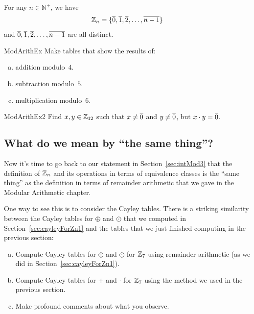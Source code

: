 \begin{prop}{}
For any $n \in \mathbb{N}^+$, we have 
	$$\mathbb{Z}_n = \{ \overline{0}, \overline{1}, \overline{2}, \ldots, \overline{n-1} \}$$
and $\overline{0}, \overline{1}, \overline{2}, \ldots, \overline{n-1}$ are all distinct.
\end{prop}


\begin{exercise}{ModArithEx}  
Make tables that show the results of:
\begin{enumerate}[(a)]
\item \label{ModArithEx-tables-addition} 
addition modulo~$4$.
\item \label{ModArithEx-tables-subtraction} 
subtraction modulo~$5$.
\item \label{ModArithEx-tables-multiplication} 
multiplication modulo~$6$.
\end{enumerate}
\end{exercise}

\begin{exercise}{ModArithEx2}  
Find $x,y \in \mathbb{Z}_{12}$ such that $x \neq \overline{0}$ and $y \neq \overline{0}$, but $x \cdot y = \overline{0}$.
\end{exercise}

\subsection{What do we mean by ``the same thing''?}\label{sec:theSameThing}
Now it's time to go back to our statement in Section~\ref{sec:intMod3} that the definition of $\mathbb{Z}_n$ and its operations in terms of equivalence classes is the ``same thing'' as the definition in terms of remainder arithmetic that we gave in the Modular Arithmetic chapter.

One way to see this is to consider the Cayley tables. There is a striking similarity between the Cayley tables for $\oplus$ and $\odot$ that we computed in Section~\ref{sec:cayleyForZn1} and the tables that we just finished computing in the previous section:

\begin{exercise}{}
\begin{enumerate}[(a)]
\item
Compute Cayley tables for $\oplus$ and $\odot$ for $\mathbb{Z}_7$ using remainder arithmetic (as we did in Section~\ref{sec:cayleyForZn1}).
\item
Compute Cayley tables for $+$ and $\cdot$ for $\mathbb{Z}_7$ using the method we used in the previous section.
\item
Make profound comments about what you observe.
\end{enumerate}
\end{exercise}

